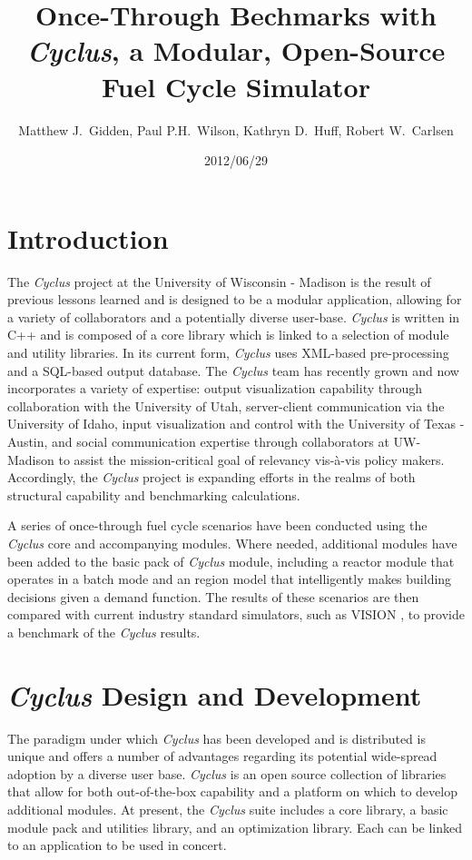 \documentclass{anstrans}
\title{Once-Through Bechmarks with \emph{Cyclus}, a Modular, Open-Source Fuel Cycle Simulator}
\author{Matthew J.~Gidden, Paul P.H.~Wilson, Kathryn D.~Huff, Robert W.~Carlsen}
\institute{Department of Nuclear Engineering \& Engineering Physics, University of Wisconsin - Madison, Madison, WI, 53703}
\date{2012/06/29}
\begin{document}
\section{Introduction}

The \emph{Cyclus} project at the University of Wisconsin - Madison is
the result of previous lessons learned and is designed to be a modular
application, allowing for a variety of collaborators and a potentially
diverse user-base. \emph{Cyclus} is written in C++ and is composed of
a core library which is linked to a selection of module and utility
libraries. In its current form, \emph{Cyclus} uses XML-based
pre-processing and a SQL-based output database. The \emph{Cyclus} team
has recently grown and now incorporates a variety of expertise: output
visualization capability through collaboration with the University of
Utah, server-client communication via the University of Idaho, input
visualization and control with the University of Texas - Austin, and
social communication expertise through collaborators at UW-Madison to
assist the mission-critical goal of relevancy vis-\`{a}-vis policy
makers. Accordingly, the \emph{Cyclus} project is expanding efforts in
the realms of both structural capability and benchmarking
calculations.

A series of once-through fuel cycle scenarios have been conducted
using the \emph{Cyclus} core and accompanying modules. Where needed,
additional modules have been added to the basic pack of \emph{Cyclus}
module, including a reactor module that operates in a batch mode and
an region model that intelligently makes building decisions given a
demand function. The results of these scenarios are then compared with
current industry standard simulators, such as VISION
\cite{vision2009}, to provide a benchmark of the \emph{Cyclus}
results.


\section{\emph{Cyclus} Design and Development}

The paradigm under which \emph{Cyclus} has been developed and is
distributed is unique and offers a number of advantages regarding its
potential wide-spread adoption by a diverse user base. \emph{Cyclus}
is an open source collection of libraries that allow for both
out-of-the-box capability and a platform on which to develop
additional modules. At present, the \emph{Cyclus} suite includes a
core library, a basic module pack and utilities library, and an
optimization library. Each can be linked to an application to be used
in concert.
\end{document}
